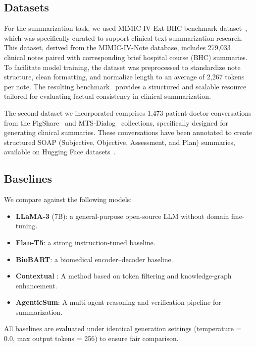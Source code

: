 \documentclass{article}
\begin{document}
\subsection{Datasets}
\label{sec:datasets}
For the summarization task, we used MIMIC-IV-Ext-BHC benchmark dataset~\citep{aali2024mimic}, which was specifically curated to support clinical text summarization research. This dataset, derived from the MIMIC-IV-Note database, includes 279,033 clinical notes paired with corresponding brief hospital course (BHC) summaries. To facilitate model training, the dataset was preprocessed to standardize note structure, clean formatting, and normalize length to an average of 2,267 tokens per note. The resulting benchmark~\citep{aali2024benchmark} provides a structured and scalable resource tailored for evaluating factual consistency in clinical summarization. 

The second dataset we incorporated comprises 1,473 patient-doctor conversations from the FigShare~\citep{singh2011figshare} and MTS-Dialog~\citep{abacha2023empirical} collections, specifically designed for generating clinical summaries. These conversations have been annotated to create structured SOAP (Subjective, Objective, Assessment, and Plan) summaries, available on Hugging Face datasets~\citep{neupane2024soap}.

\subsection{Baselines}
\label{sec:baselines}

We compare against the following models:

\begin{itemize}
    \item \textbf{LLaMA-3} (7B): a general-purpose open-source LLM without domain fine-tuning.
    \item \textbf{Flan-T5}: a strong instruction-tuned baseline.
    \item \textbf{BioBART}: a biomedical encoder–decoder baseline.
    \item \textbf{Contextual} \citep{piya2025contextual}: A method based on token filtering and knowledge-graph enhancement.
    \item \textbf{AgenticSum}: A multi-agent reasoning and verification pipeline for summarization.
\end{itemize}

All baselines are evaluated under identical generation settings (temperature = 0.0, max output tokens = 256) to ensure fair comparison.
\end{document}
